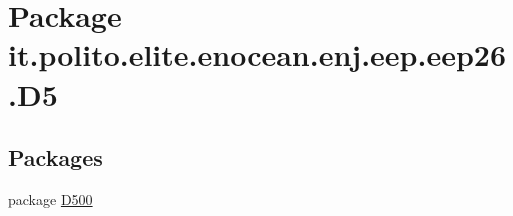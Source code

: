 \hypertarget{namespaceit_1_1polito_1_1elite_1_1enocean_1_1enj_1_1eep_1_1eep26_1_1_d5}{}\section{Package it.\+polito.\+elite.\+enocean.\+enj.\+eep.\+eep26.\+D5}
\label{namespaceit_1_1polito_1_1elite_1_1enocean_1_1enj_1_1eep_1_1eep26_1_1_d5}
\subsection*{Packages}
\begin{DoxyCompactItemize}
\item 
package \hyperlink{namespaceit_1_1polito_1_1elite_1_1enocean_1_1enj_1_1eep_1_1eep26_1_1_d5_1_1_d500}{D500}
\end{DoxyCompactItemize}
